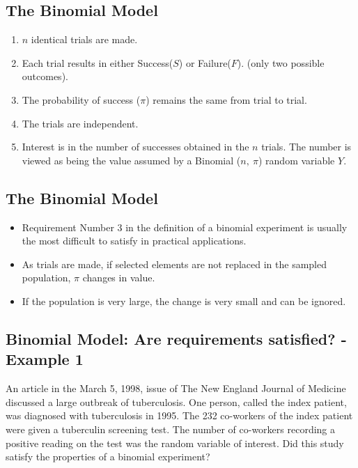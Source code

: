 \documentclass[
  letterpaper,
  DIV=11,
  numbers=noendperiod]{scrartcl}
\begin{document}
\subsection{The Binomial Model}\label{the-binomial-model}

\begin{enumerate}
\def\labelenumi{\arabic{enumi}.}
\item
  \(n\) identical trials are made.
\item
  Each trial results in either {Success(\(S\))} or {Failure(\(F\))}.
  (only two possible outcomes).
\item
  The probability of success (\(\pi\)) remains the same from trial to
  trial.
\item
  The trials are independent.
\item
  Interest is in the number of successes obtained in the \(n\) trials.
  The number is viewed as being the value assumed by a Binomial
  (\(n,\ \pi\)) random variable \(Y\).
\end{enumerate}

\subsection{The Binomial Model}\label{the-binomial-model-1}

\begin{itemize}
\item
  Requirement Number 3 in the definition of a binomial experiment is
  usually the most difficult to satisfy in practical applications.
\item
  As trials are made, if selected elements are not replaced in the
  sampled population, \(\pi\) changes in value.
\item
  If the population is very large, the change is very small and can be
  ignored.
\end{itemize}

\subsection{Binomial Model: Are requirements satisfied? - Example
1}\label{binomial-model-are-requirements-satisfied---example-1}

An article in the March 5, 1998, issue of The New England Journal of
Medicine discussed a large outbreak of tuberculosis. One person, called
the index patient, was diagnosed with tuberculosis in 1995. The 232
co-workers of the index patient were given a tuberculin screening test.
The number of co-workers recording a positive reading on the test was
the random variable of interest. Did this study satisfy the properties
of a binomial experiment?
\end{document}
